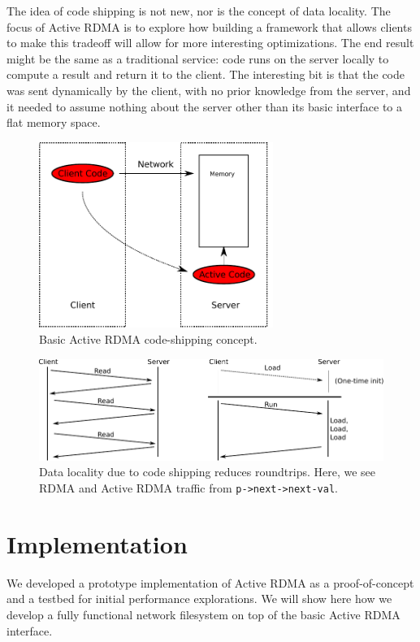 \documentclass[10pt]{article}
\begin{document}
The idea of code shipping is not new, nor is the concept of data
locality. The focus of Active RDMA is to explore how building a
framework that allows clients to make this tradeoff will allow for
more interesting optimizations. The end result might be the same as a
traditional service: code runs on the server locally to compute a
result and return it to the client. The interesting bit is that the
code was sent dynamically by the client, with no prior knowledge from
the server, and it needed to assume nothing about the server other
than its basic interface to a flat memory space.

\begin{figure}
\centering
\includegraphics[width=3in]{fig/fig1.pdf}
\caption{Basic Active RDMA code-shipping concept.}
\label{fig:fig1}
\end{figure}

\begin{figure}
\centering
\includegraphics[width=5in]{fig/fig2.pdf}
\caption{Data locality due to code shipping reduces roundtrips. Here, we see RDMA and Active RDMA traffic from {\tt p->next->next-val}.}
\label{fig:fig2}
\end{figure}

\section{Implementation}

We developed a prototype implementation of Active RDMA as a
proof-of-concept and a testbed for initial performance
explorations. We will show here how we develop a fully functional
network filesystem on top of the basic Active RDMA interface.
\end{document}
